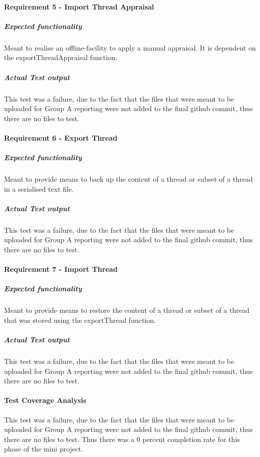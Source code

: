 \paragraph{ Requirement 5 - Import Thread Appraisal}
	\subparagraph{Expected functionality}
	Meant to realise an offline-facility to apply a manual appraisal. It is dependent on the exportThreadAppraisal function.
	\subparagraph{Actual Test output}
	This test was a failure, due to the fact that the files that were meant to be uploaded for Group A reporting were not added to the final github commit, thus there are no files to test.
	
\paragraph{ Requirement 6 - Export Thread}
\subparagraph{Expected functionality}
	Meant to provide means to back up the content of a thread or subset of a thread in a serialised text file.
	\subparagraph{Actual Test output}
	This test was a failure, due to the fact that the files that were meant to be uploaded for Group A reporting were not added to the final github commit, thus there are no files to test.
	
\paragraph{Requirement 7 - Import Thread}
	\subparagraph{Expected functionality}
	Meant to provide means to restore the content of a thread or subset of a thread that was stored using the exportThread function.
	\subparagraph{Actual Test output}
	This test was a failure, due to the fact that the files that were meant to be uploaded for Group A reporting were not added to the final github commit, thus there are no files to test.
	
\paragraph{Test Coverage Analysis}
This test was a failure, due to the fact that the files that were meant to be uploaded for Group A reporting were not added to the final github commit, thus there are no files to test. 
Thus there was a 0 percent completion rate for this phase of the mini project.

		